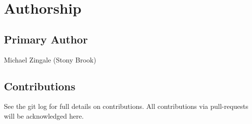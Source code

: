 \clearpage

\section*{Authorship}

\subsection*{Primary Author}

Michael Zingale (Stony Brook)


\subsection*{Contributions}

See the git log for full details on contributions.  All contributions
via pull-requests will be acknowledged here.
